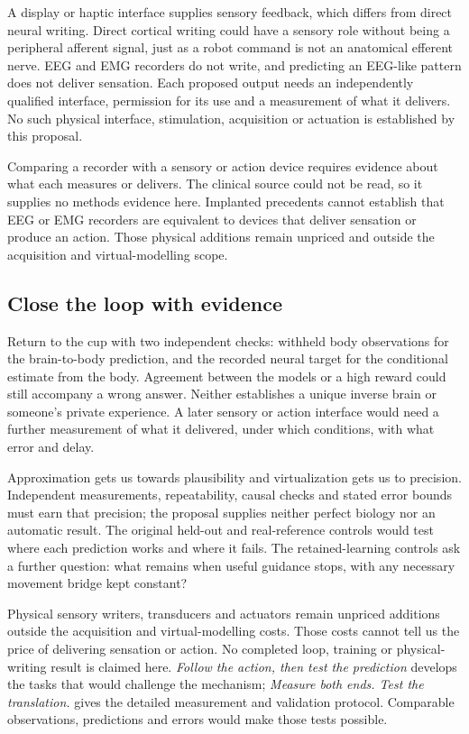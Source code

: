 A display or haptic interface supplies sensory feedback, which differs from direct neural writing. Direct cortical writing could have a sensory role without being a peripheral afferent signal, just as a robot command is not an anatomical efferent nerve. EEG and EMG recorders do not write, and predicting an EEG-like pattern does not deliver sensation. Each proposed output needs an independently qualified interface, permission for its use and a measurement of what it delivers. No such physical interface, stimulation, acquisition or actuation is established by this proposal.

Comparing a recorder with a sensory or action device requires evidence about what each measures or delivers. The clinical source could not be read, so it supplies no methods evidence here. Implanted precedents cannot establish that EEG or EMG recorders are equivalent to devices that deliver sensation or produce an action. Those physical additions remain unpriced and outside the acquisition and virtual-modelling scope.

\subsection{Close the loop with evidence}
Return to the cup with two independent checks: withheld body observations
for the brain-to-body prediction, and the recorded neural target for the
conditional estimate from the body. Agreement between the models or a high
reward could still accompany a wrong answer. Neither establishes a unique
inverse brain or someone's private experience. A later sensory or action
interface would need a further measurement of what it delivered, under which
conditions, with what error and delay.

Approximation gets us towards plausibility and virtualization gets us to
precision. Independent measurements, repeatability, causal checks and stated
error bounds must earn that precision; the proposal supplies neither perfect
biology nor an automatic result. The original held-out and real-reference
controls would test where each prediction works and where it fails. The
retained-learning controls ask a further question: what remains when useful
guidance stops, with any necessary movement bridge kept constant?

Physical sensory writers, transducers and actuators remain unpriced additions
outside the acquisition and virtual-modelling costs. Those costs cannot tell us
the price of delivering sensation or action. No completed loop, training or
physical-writing result is claimed here. \emph{Follow the action, then test the
prediction} develops the tasks that would challenge the mechanism;
\emph{Measure both ends. Test the translation.} gives the detailed measurement
and validation protocol. Comparable observations, predictions and errors would make those tests possible.

